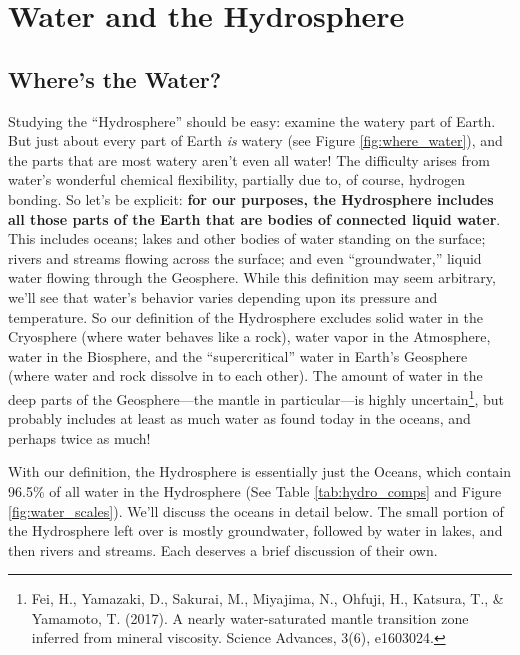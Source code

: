 \section{Water and the Hydrosphere}
\subsection{Where's the Water?}
 Studying the ``Hydrosphere'' should be easy: examine the watery part of Earth. But just about every part of Earth \emph{is} watery (see Figure \ref{fig:where_water}), and the parts that are most watery aren't even all water! The difficulty arises from water's wonderful chemical flexibility, partially due to, of course, hydrogen bonding. So let's be explicit: \textbf{for our purposes, the Hydrosphere includes all those parts of the Earth that are bodies of connected liquid water}. This includes oceans; lakes and other bodies of water standing on the surface; rivers and streams flowing across the surface; and even ``groundwater,'' liquid water flowing through the Geosphere. While this definition may seem arbitrary, we'll see that water's behavior varies depending upon its pressure and temperature. So our definition of the Hydrosphere excludes solid water in the Cryosphere (where water behaves like a rock), water vapor in the Atmosphere, water in the Biosphere, and the ``supercritical'' water in Earth's Geosphere (where water and rock dissolve in to each other). The amount of water in the deep parts of the Geosphere---the mantle in particular---is highly uncertain\footnote{Fei, H., Yamazaki, D., Sakurai, M., Miyajima, N., Ohfuji, H., Katsura, T., \& Yamamoto, T. (2017). A nearly water-saturated mantle transition zone inferred from mineral viscosity. Science Advances, 3(6), e1603024.}, but probably includes at least as much water as found today in the oceans, and perhaps twice as much! 
    
With our definition, the Hydrosphere is essentially just the Oceans, which contain 96.5\% of all water in the Hydrosphere (See Table \ref{tab:hydro_comps} and Figure \ref{fig:water_scales}). We'll discuss the oceans in detail below. The small portion of the Hydrosphere left over is mostly groundwater, followed by water in lakes, and then rivers and streams. Each deserves a brief discussion of their own.

